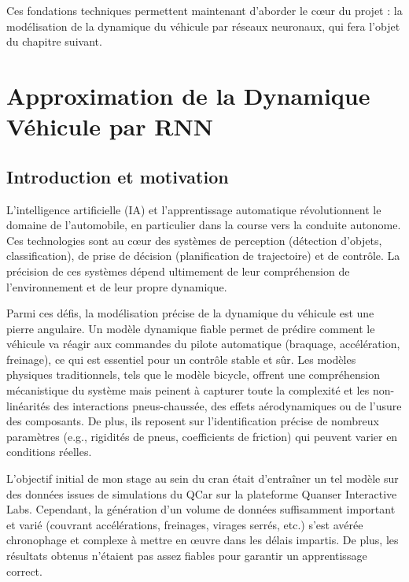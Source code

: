 \documentclass[12pt, a4paper]{report}
\begin{document}
Ces fondations techniques permettent maintenant d'aborder le cœur du projet : la modélisation de la dynamique du véhicule par réseaux neuronaux, qui fera l'objet du chapitre suivant. 



%
\chapter{Approximation de la Dynamique Véhicule par RNN}\label{chap:modelisation}

\section{Introduction et motivation}
\label{sec:intro_motivation}

L'intelligence artificielle (IA) et l'apprentissage automatique révolutionnent le domaine de l'automobile, en particulier dans la course vers la conduite autonome. Ces technologies sont au cœur des systèmes de perception (détection d'objets, classification), de prise de décision (planification de trajectoire) et de contrôle. La précision de ces systèmes dépend ultimement de leur compréhension de l'environnement et de leur propre dynamique.

Parmi ces défis, la modélisation précise de la dynamique du véhicule est une pierre angulaire. Un modèle dynamique fiable permet de prédire comment le véhicule va réagir aux commandes du pilote automatique (braquage, accélération, freinage), ce qui est essentiel pour un contrôle stable et sûr. Les modèles physiques traditionnels, tels que le modèle bicycle, offrent une compréhension mécanistique du système mais peinent à capturer toute la complexité et les non-linéarités des interactions pneus-chaussée, des effets aérodynamiques ou de l'usure des composants. De plus, ils reposent sur l'identification précise de nombreux paramètres (e.g., rigidités de pneus, coefficients de friction) qui peuvent varier en conditions réelles.

L'objectif initial de mon stage au sein du cran était d'entraîner un tel modèle sur des données issues de simulations du QCar sur la plateforme Quanser Interactive Labs. Cependant, la génération d'un volume de données suffisamment important et varié (couvrant accélérations, freinages, virages serrés, etc.) s'est avérée chronophage et complexe à mettre en œuvre dans les délais impartis. De plus, les résultats obtenus n'étaient pas assez fiables pour garantir un apprentissage correct.
\end{document}

